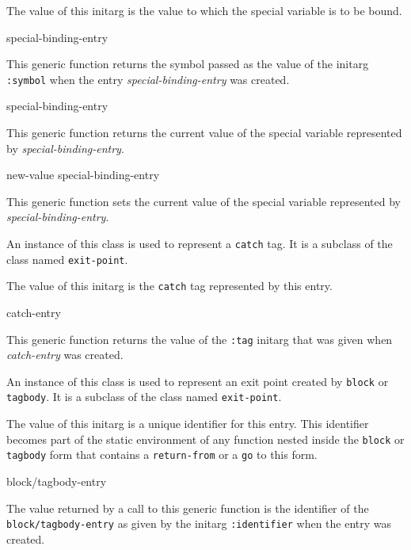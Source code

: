 
The value of this initarg is the value to which the special variable
is to be bound.

 {special-binding-entry}

This generic function returns the symbol passed as the value of the
initarg \texttt{:symbol} when the entry \textit{special-binding-entry}
was created.

 {special-binding-entry}

This generic function returns the current value of the special
variable represented by \textit{special-binding-entry}.

 {new-value special-binding-entry}

This generic function sets the current value of the special
variable represented by \textit{special-binding-entry}.


An instance of this class is used to represent a \texttt{catch} tag.
It is a subclass of the class named \texttt{exit-point}.


The value of this initarg is the \texttt{catch} tag represented by
this entry.

 {catch-entry}

This generic function returns the value of the \texttt{:tag} initarg
that was given when \textit{catch-entry} was created.


An instance of this class is used to represent an exit point created
by \texttt{block} or \texttt{tagbody}.  It is a subclass of the class
named \texttt{exit-point}.


The value of this initarg is a unique identifier for this entry.  This
identifier becomes part of the static environment of any function
nested inside the \texttt{block} or \texttt{tagbody} form that
contains a \texttt{return-from} or a \texttt{go} to this form.

 {block/tagbody-entry}

The value returned by a call to this generic function is the
identifier of the \texttt{block/tagbody-entry} as given by the initarg
\texttt{:identifier} when the entry was created.


